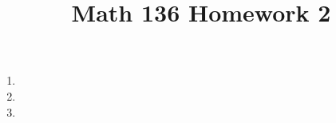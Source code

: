 \documentclass{article}
\title{Math 136 Homework 2}
\begin{document}
    \maketitle
    \begin{enumerate}
      \item 
      \item 
      \item 
    \end{enumerate}
\end{document}
